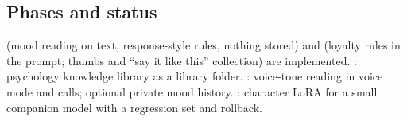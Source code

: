\subsection{Phases and status}

 (mood reading on text, response-style rules, nothing stored) and  (loyalty rules in the prompt; thumbs and ``say it like this'' collection) are implemented. : psychology knowledge library as a library folder. : voice-tone reading in voice mode and calls; optional private mood history. : character LoRA for a small companion model with a regression set and rollback.
